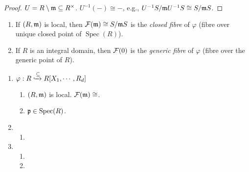 \begin{proof}
    $U = R \setminus \mathfrak{m} \subseteq R^\times$. $U^{-1}(-) \cong -$, e.g., $U^{-1}S/\mathfrak{m} U^{-1}S \cong S/\mathfrak{m} S$.
\end{proof}

\begin{definition}
    \begin{enumerate}
        \item If $(R,\mathfrak{m})$ is local, then $\mathcal{F}(\mathfrak{m}) \cong S/\mathfrak{m} S$ is the \emph{closed fibre} of $\varphi$ (fibre over unique closed point of $\operatorname{Spec}(R)$).
        \item 
            If $R$ is an integral domain, then $\mathcal{F}(0)$ is the \emph{generic fibre} of $\varphi$ (fibre over the generic point of $R$).
    \end{enumerate}
\end{definition}

\begin{example}
    \begin{enumerate}
        \item $\varphi: R \xhookrightarrow \subseteq R[X_1,\cdots,R_d]$
            \begin{enumerate}
                \item $(R,\mathfrak{m})$ is local. $\mathcal{F}(\mathfrak{m}) \cong $.
                \item $\mathfrak{p} \in \operatorname{Spec}(R)$.
            \end{enumerate}
        \item 
            \begin{enumerate}
                \item
            \end{enumerate}
        \item
            \begin{enumerate}
                \item 
                \item 
            \end{enumerate}
    \end{enumerate}
\end{example}


